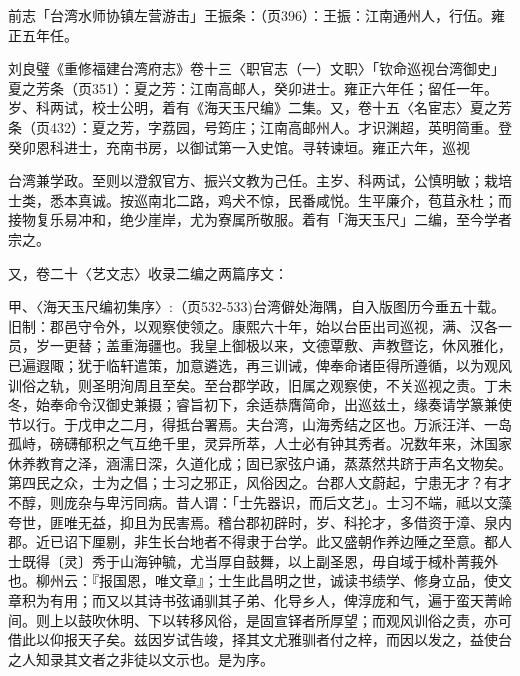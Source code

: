 \noindent 前志「台湾水师协镇左营游击」王振条：（页396）：王振：江南通州人，行伍。雍正五年任。


\noindent 刘良璧《重修福建台湾府志》卷十三〈职官志（一）文职〉「钦命巡视台湾御史」夏之芳条（页351）：夏之芳：江南高邮人，癸卯进士。雍正六年任；留任一年。岁、科两试，校士公明，着有《海天玉尺编》二集。又，卷十五〈名宦志〉夏之芳条（页432）：夏之芳，字荔园，号筠庄；江南高邮州人。才识渊超，英明简重。登癸卯恩科进士，充南书房，以御试第一入史馆。寻转谏垣。雍正六年，巡视

\vfill
\begin{BookNotes}
\end{BookNotes}

\noindent 台湾兼学政。至则以澄叙官方、振兴文教为己任。主岁、科两试，公慎明敏；栽培士类，悉本真诚。按巡南北二路，鸡犬不惊，民番咸悦。生平廉介，苞苴永杜；而接物复乐易冲和，绝少崖岸，尤为寮属所敬服。着有「海天玉尺」二编，至今学者宗之。

又，卷二十〈艺文志〉收录二编之两篇序文：

甲、〈海天玉尺编初集序〉:（页532-533)台湾僻处海隅，自入版图历今垂五十载。旧制：郡邑守令外，以观察使领之。康熙六十年，始以台臣出司巡视，满、汉各一员，岁一更替；盖重海疆也。我皇上御极以来，文德覃敷、声教暨讫，休风雅化，已遍遐陬；犹于临轩遣策，加意遴选，再三训诫，俾奉命诸臣得所遵循，以为观风训俗之轨，则圣明洵周且至矣。至台郡学政，旧属之观察使，不关巡视之责。丁未冬，始奉命令汉御史兼摄；睿旨初下，余适恭膺简命，出巡兹土，缘奏请学篆兼使节以行。于戊申之二月，得抵台署焉。夫台湾，山海秀结之区也。万派汪洋、一岛孤峙，磅礴郁积之气互绝千里，灵异所萃，人士必有钟其秀者。况数年来，沐国家休养教育之泽，涵濡日深，久道化成；固已家弦户诵，蒸蒸然共跻于声名文物矣。第四民之众，士为之倡；士习之邪正，风俗因之。台郡人文蔚起，宁患无才？有才不醇，则庞杂与卑污同病。昔人谓：「士先器识，而后文艺」。士习不端，祗以文藻夸世，匪唯无益，抑且为民害焉。稽台郡初辟时，岁、科抡才，多借资于漳、泉内郡。近已诏下厘剔，非生长台地者不得隶于台学。此又盛朝作养边陲之至意。都人士既得〔灵〕秀于山海钟毓，尤当厚自鼓舞，以上副圣恩，毋自域于棫朴菁莪外也。柳州云：『报国恩，唯文章』；士生此昌明之世，诚读书绩学、修身立品，使文章积为有用；而又以其诗书弦诵驯其子弟、化导乡人，俾淳庞和气，遍于蛮天菁岭间。则上以鼓吹休明、下以转移风俗，是固宣铎者所厚望；而观风训俗之责，亦可借此以仰报天子矣。兹因岁试告竣，择其文尤雅驯者付之梓，而因以发之，益使台之人知录其文者之非徒以文示也。是为序。


